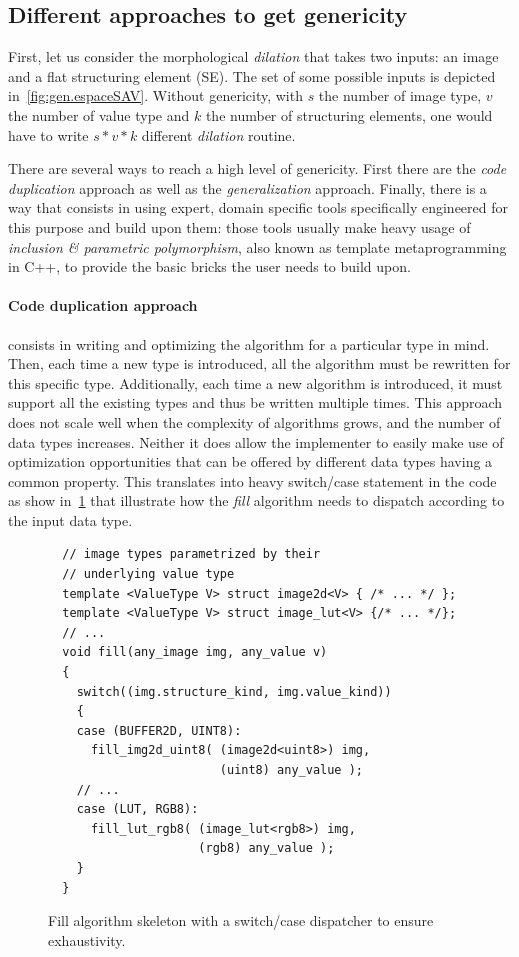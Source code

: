 \subsection{Different approaches to get genericity}
\label{subsec:different.approaches}

First, let us consider the morphological \emph{dilation} that takes two inputs: an image and a flat structuring element
(SE). The set of some possible inputs is depicted in~\ref{fig:gen.espaceSAV}. Without genericity, with $s$ the
number of image type, $v$ the number of value type and $k$ the number of structuring elements, one would have to write
$s * v * k$ different \emph{dilation} routine.

There are several ways to reach a high level of genericity. First there are the \emph{code duplication} approach as well
as the \emph{generalization} approach. Finally, there is a way that consists in using expert, domain specific tools
specifically engineered for this purpose and build upon them: those tools usually make heavy usage of \emph{inclusion
  \& parametric polymorphism}, also known as template metaprogramming in C++, to provide the basic bricks the user needs
to build upon.

\paragraph{Code duplication approach} consists in writing and optimizing the algorithm for a particular type in mind.
Then, each time a new type is introduced, all the algorithm must be rewritten for this specific type. Additionally, each
time a new algorithm is introduced, it must support all the existing types and thus be written multiple times. This
approach does not scale well when the complexity of algorithms grows, and the number of data types increases. Neither it
does allow the implementer to easily make use of optimization opportunities that can be offered by different data types
having a common property. This translates into heavy switch/case statement in the code as show in~\ref{code:gen.exhau}
that illustrate how the \emph{fill} algorithm needs to dispatch according to the input data type.

\begin{figure}[htbp]
  \centering
  \begin{verbatim}
  // image types parametrized by their
  // underlying value type
  template <ValueType V> struct image2d<V> { /* ... */ };
  template <ValueType V> struct image_lut<V> {/* ... */};
  // ...
  void fill(any_image img, any_value v)
  {
    switch((img.structure_kind, img.value_kind))
    {
    case (BUFFER2D, UINT8):
      fill_img2d_uint8( (image2d<uint8>) img,
                        (uint8) any_value );
    // ...
    case (LUT, RGB8):
      fill_lut_rgb8( (image_lut<rgb8>) img,
                     (rgb8) any_value );
    }
  }
  \end{verbatim}
  \caption{Fill algorithm skeleton with a switch/case dispatcher to ensure exhaustivity.}
  \label{code:gen.exhau}
\end{figure}

